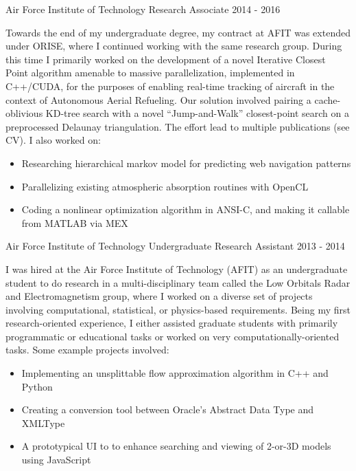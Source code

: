 \documentclass[11pt,a4paper,sans]{moderncv} %
\begin{document}
			 {Air Force Institute of Technology}
			 {Research Associate}
			 {2014 - 2016}{}{\vspace{3pt}
Towards the end of my undergraduate degree, my contract at AFIT was extended under ORISE, where I continued working with the same research group. 
During this time I primarily worked on the development of a novel Iterative Closest Point algorithm amenable to massive parallelization, implemented in C++/CUDA, for the purposes of enabling real-time tracking of aircraft in the context of Autonomous Aerial Refueling. Our solution involved pairing a cache-oblivious KD-tree search with a novel ``Jump-and-Walk'' closest-point search on a preprocessed Delaunay triangulation. The effort lead to multiple publications (see CV). I also worked on:
\begin{itemize}
	\item Researching hierarchical markov model for predicting web navigation patterns 
	\item Parallelizing existing atmospheric absorption routines with OpenCL 
	\item Coding a nonlinear optimization algorithm in ANSI-C, and making it callable from MATLAB via MEX
\end{itemize}
}
\vspace{0.75em}
			 {Air Force Institute of Technology}
			 {Undergraduate Research Assistant}
			 {2013 - 2014}{}{\vspace{3pt}
I was hired at the Air Force Institute of Technology (AFIT) as an undergraduate student to do research in a multi-disciplinary team called the Low Orbitals Radar and Electromagnetism group, where I worked on a diverse set of projects involving computational, statistical, or physics-based requirements. Being my first research-oriented experience, I either assisted graduate students with primarily programmatic or educational tasks or worked on very computationally-oriented tasks. Some example projects involved: 
\begin{itemize}
	\item Implementing an unsplittable flow approximation algorithm in C++ and Python
	\item Creating a conversion tool between Oracle's Abstract Data Type and XMLType
	\item A prototypical UI to to enhance searching and viewing of 2-or-3D models using JavaScript
\end{itemize}	
}
\end{document}
